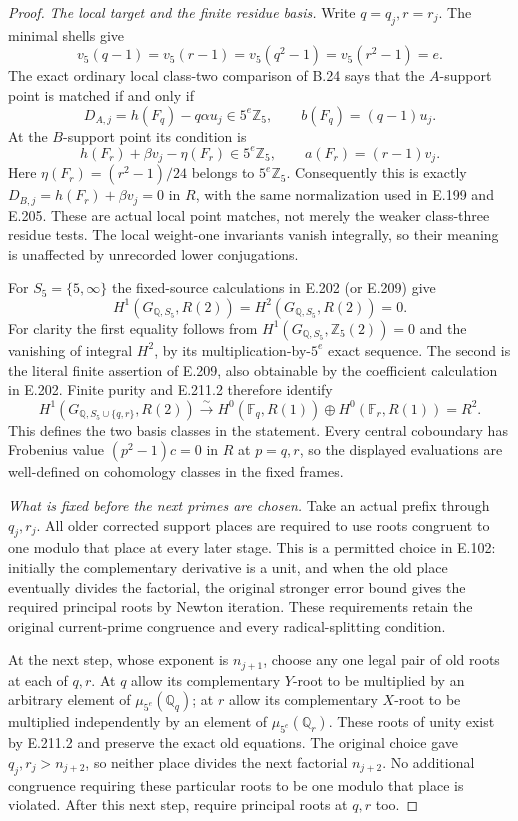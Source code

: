 \begin{proof}
\emph{The local target and the finite residue basis.}
Write $q=q_j,r=r_j$. The minimal shells give
\[
 v_5(q-1)=v_5(r-1)=v_5(q^2-1)=v_5(r^2-1)=e.
 \tag{E.211.2}
\]
The exact ordinary local class-two comparison of B.24 says that
the $A$-support point is matched if and only if
\[
 D_{A,j}=h(F_q)-q\alpha u_j\in5^e\mathbb Z_5,
 \qquad b(F_q)=(q-1)u_j.
 \tag{E.211.3}
\]
At the $B$-support point its condition is
\[
 h(F_r)+\beta v_j-\eta(F_r)\in5^e\mathbb Z_5,
 \qquad a(F_r)=(r-1)v_j.
\]
Here $\eta(F_r)=(r^2-1)/24$ belongs to $5^e\mathbb Z_5$.
Consequently this is exactly
$D_{B,j}=h(F_r)+\beta v_j=0$ in $R$, with the same
normalization used in E.199 and E.205. These are actual local
point matches, not merely the weaker class-three residue tests.
The local weight-one invariants vanish integrally, so their
meaning is unaffected by unrecorded lower conjugations.

For $S_5=\{5,\infty\}$ the fixed-source calculations in E.202
(or E.209) give
\[
 H^1(G_{\mathbb Q,S_5},R(2))=
 H^2(G_{\mathbb Q,S_5},R(2))=0.
 \tag{E.211.4}
\]
For clarity the first equality follows from
$H^1(G_{\mathbb Q,S_5},\mathbb Z_5(2))=0$ and the vanishing
of integral $H^2$, by its multiplication-by-$5^e$ exact sequence.
The second is the literal finite assertion of E.209, also
obtainable by the coefficient calculation in E.202.
Finite purity and E.211.2 therefore identify
\[
 H^1(G_{\mathbb Q,S_5\cup\{q,r\}},R(2))
 \xrightarrow{\sim}
 H^0(\mathbb F_q,R(1))\oplus H^0(\mathbb F_r,R(1))=R^2.
 \tag{E.211.5}
\]
This defines the two basis classes in the statement.
Every central coboundary has Frobenius value
$(p^2-1)c=0$ in $R$ at $p=q,r$, so the displayed evaluations
are well-defined on cohomology classes in the fixed frames.

\emph{What is fixed before the next primes are chosen.}
Take an actual prefix through $q_j,r_j$. All older corrected
support places are required to use roots congruent to one modulo
that place at every later stage. This is a permitted choice in
E.102: initially the complementary derivative is a unit, and when
the old place eventually divides the factorial, the original
stronger error bound gives the required principal roots by Newton
iteration. These requirements retain the original current-prime
congruence and every radical-splitting condition.

At the next step, whose exponent is $n_{j+1}$, choose any one
legal pair of old roots at each of $q,r$. At $q$ allow its
complementary $Y$-root to be multiplied by an arbitrary element
of $\mu_{5^e}(\mathbb Q_q)$; at $r$ allow its complementary
$X$-root to be multiplied independently by an element of
$\mu_{5^e}(\mathbb Q_r)$. These roots of unity exist by
E.211.2 and preserve the exact old equations. The original
choice gave $q_j,r_j>n_{j+2}$, so neither place divides the
next factorial $n_{j+2}$. No additional congruence requiring
these particular roots to be one modulo that place is violated.
After this next step, require principal roots at $q,r$ too.


\end{proof}

